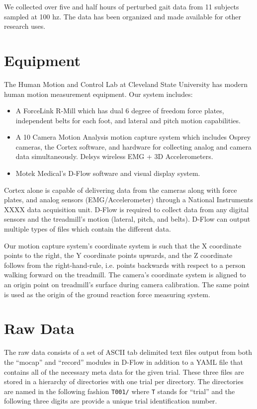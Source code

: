 \documentclass[10pt,a4paper,twocolumn]{article}
\begin{document}
We collected over five and half hours of perturbed gait data from 11 subjects
sampled at 100 hz. The data has been organized and made available for other
research uses.

\section*{Equipment}
%
The Human Motion and Control Lab at Cleveland State University has modern human
motion measurement equipment. Our system includes:

\begin{itemize}
  \item A ForceLink R-Mill which has dual 6 degree of freedom force plates,
    independent belts for each foot, and lateral and pitch motion capabilities.
  \item A 10 Camera Motion Analysis motion capture system which includes Osprey
    cameras, the Cortex software, and hardware for collecting analog and camera
    data simultaneously. Delsys wireless EMG + 3D Accelerometers.
  \item Motek Medical’s D-Flow software and visual display system.
\end{itemize}

Cortex alone is capable of delivering data from the cameras along with force
plates, and analog sensors (EMG/Accelerometer) through a National Instruments
XXXX data acquisition unit. D-Flow is required to collect data from any digital
sensors and the treadmill's motion (lateral, pitch, and belts). D-Flow can
output multiple types of files which contain the different data.

Our motion capture system's coordinate system is such that the X coordinate
points to the right, the Y coordinate points upwards, and the Z coordinate
follows from the right-hand-rule, i.e. points backwards with respect to a
person walking forward on the treadmill. The camera's coordinate system is
aligned to an origin point on treadmill's surface during camera calibration.
The same point is used as the origin of the ground reaction force measuring
system.

\section*{Raw Data}
%
The raw data consists of a set of ASCII tab delimited text files output from
both the ``mocap'' and ``record'' modules in D-Flow in addition to a YAML file
that contains all of the necessary meta data for the given trial. These three
files are stored in a hierarchy of directories with one trial per directory.
The directories are named in the following fashion \verb+T001/+ where \verb+T+
stands for ``trial'' and the following three digits are provide a unique trial
identification number.
\end{document}
